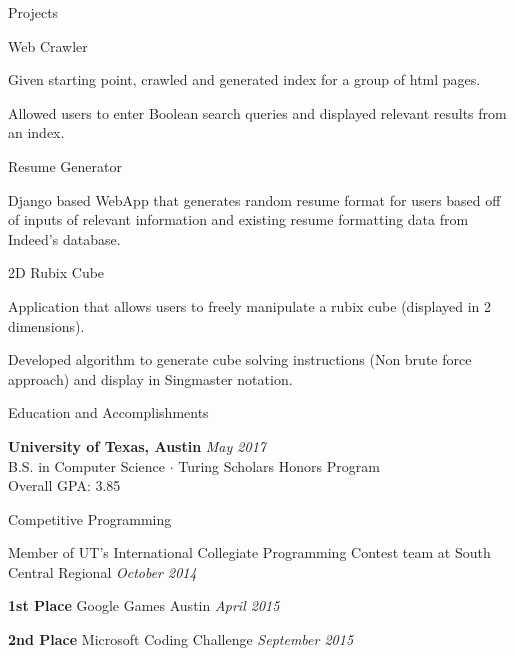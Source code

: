 \documentclass{resume} %
\begin{document}
\begin{rSection}{Projects}

  \begin{rSubsection}{Web Crawler}{}{}{}
  \item Given starting point, crawled and generated index for a group of html pages. 
  \item Allowed users to enter Boolean search queries and displayed relevant results from an index.  
  \end{rSubsection}

  \begin{rSubsection}{Resume Generator}{}{}{}
  \item Django based WebApp that generates random resume format for users based off of inputs of relevant information and existing resume formatting data from Indeed's database. 
  \end{rSubsection}

  \begin{rSubsection}{2D Rubix Cube}{}{}{}
  \item Application that allows users to freely manipulate a rubix cube (displayed in 2 dimensions).
  \item Developed algorithm to generate cube solving instructions (Non brute force approach) and display in Singmaster notation. 
  \end{rSubsection}

\end{rSection}


\begin{rSection}{Education and Accomplishments}

  {\bf University of Texas, Austin} \hfill {\em May 2017} \\ 
  B.S. in Computer Science $\cdot$ Turing Scholars Honors Program  \\
  Overall GPA: 3.85

\begin{rSubsection}{Competitive Programming}{}{}{}
\item Member of UT's International Collegiate Programming Contest team at South Central Regional \hfill {\em October 2014}
\item {\bf 1st Place} Google Games Austin \hfill {\em April 2015}
\item {\bf 2nd Place} Microsoft Coding Challenge \hfill {\em September 2015}
\end{rSubsection}

\end{rSection}
\end{document}
